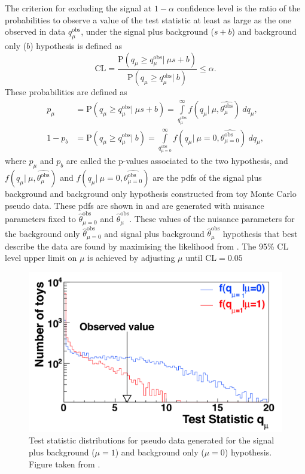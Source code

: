 The criterion for excluding the signal at $1-\alpha$ confidence level is the ratio of the probabilities to observe a value of the test statistic at least as large as the one observed in data $q_{\mu}^{\mathrm{obs}}$, under the signal plus background ($s+b$) and background only ($b$) hypothesis is defined as
\begin{equation}
\mathrm{CL} = \frac{\mathrm{P}\left(q_{\mu} \geq q_{\mu}^{\mathrm{obs}}|\: \mu s + b\right)}{\mathrm{P}\left(q_{\mu} \geq q_{\mu}^{\mathrm{obs}}| \:b\right)} \leq \alpha.
\end{equation}
These probabilities are defined as 
\begin{equation}
\begin{aligned}
  p_{\mu} &= \mathrm{P}\left(q_{\mu} \geq q_{\mu}^{\mathrm{obs}}|\: \mu s + b\right) = \int \limits_{q^{\mathrm{obs}}_{\mu}}^{\infty} f(q_{\mu}|\: \mu, \hat{\theta_{\mu}^{\mathrm{obs}}}) \:dq_{\mu}, \\
  1-p_{b} &= \mathrm{P}\left(q_{\mu} \geq q_{\mu}^{\mathrm{obs}}|\:  b\right) = \int \limits_{q^{\mathrm{obs}}_{\mu=0}}^{\infty} f(q_{\mu}|\: \mu=0, \hat{\theta_{\mu=0}^{\mathrm{obs}}}) \:dq_{\mu}, 
\end{aligned}
\end{equation}
where $ p_{\mu}$ and $ p_{b}$ are called the p-values associated to the two hypothesis, and  $f(q_{\mu}|\: \mu, \hat{\theta_{\mu}^{\mathrm{obs}}})$ and $f(q_{\mu}|\: \mu=0, \hat{\theta_{\mu=0}^{\mathrm{obs}}})$ are the pdfs of the signal plus background and background only hypothesis constructed from toy Monte Carlo pseudo data. These pdfs are shown in 
and are generated with nuisance parameters fixed to $\hat{\theta}_{\mu=0}^{\mathrm{obs}}$ and $\hat{\theta}_{\mu}^{\mathrm{obs}}$.
These values of the nuisance parameters for the background only $\hat{\theta}_{\mu=0}^{\mathrm{obs}}$ and signal plus background  $\hat{\theta}_{\mu}^{\mathrm{obs}}$ hypothesis that best describe the data are found by maximising the likelihood from . The 95\% CL level upper limit on $\mu$ is achieved by adjusting $\mu$ until CL$ = 0.05$
\begin{figure}[htbp]
	\centering
	\includegraphics[width=0.5\linewidth]{3_Analysis_techniques/Figures/teststat}
	\caption{Test statistic distributions for pseudo data generated for the signal plus background ($\mu=1$) and background only ($\mu=0$) hypothesis. Figure taken from \cite{CMS-NOTE-2011-005}.}
	\label{fig:pdf}
\end{figure}
